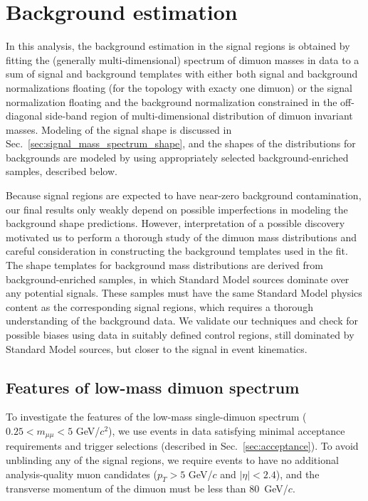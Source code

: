 \section{Background estimation}

In this analysis, the background estimation in the signal regions is
obtained by fitting the (generally multi-dimensional) spectrum of
dimuon masses in data to a sum of signal and background templates with
either both signal and background normalizations floating (for the topology
with exacty one dimuon) or the signal normalization floating and the 
background normalization constrained in the off-diagonal side-band region 
of multi-dimensional distribution of dimuon invariant masses. Modeling of the signal shape is
discussed in Sec.~\ref{sec:signal_mass_spectrum_shape}, and the shapes
of the distributions for backgrounds are modeled by using
appropriately selected background-enriched samples, described below.

Because signal regions are expected to have near-zero background
contamination, our final results only weakly depend on possible
imperfections in modeling the background shape predictions. However,
interpretation of a possible discovery motivated us to perform a thorough
study of the dimuon mass distributions and careful consideration in
constructing the background templates used in the fit. The shape
templates for background mass distributions are derived from
background-enriched samples, in which Standard Model sources dominate
over any potential signals.  These samples must have the same Standard
Model physics content as the corresponding signal regions, which requires
a thorough understanding of the background data. We validate our
techniques and check for possible biases using data in suitably
defined control regions, still dominated by Standard Model
sources, but closer to the signal in event kinematics.

\subsection{Features of low-mass dimuon spectrum}
\label{sec:lowmassspectrum}

To investigate the features of the low-mass single-dimuon spectrum
($0.25<m_{\mu\mu}<5$ GeV/$c^2$), we use events in data satisfying
minimal acceptance requirements and trigger selections (described in
Sec.~\ref{sec:acceptance}). To avoid unblinding any of the signal
regions, we require events to have no additional analysis-quality muon
candidates ($p_T>5$ GeV/$c$ and $|\eta|<2.4$), and the transverse
momentum of the dimuon must be less than 80~GeV/$c$.

